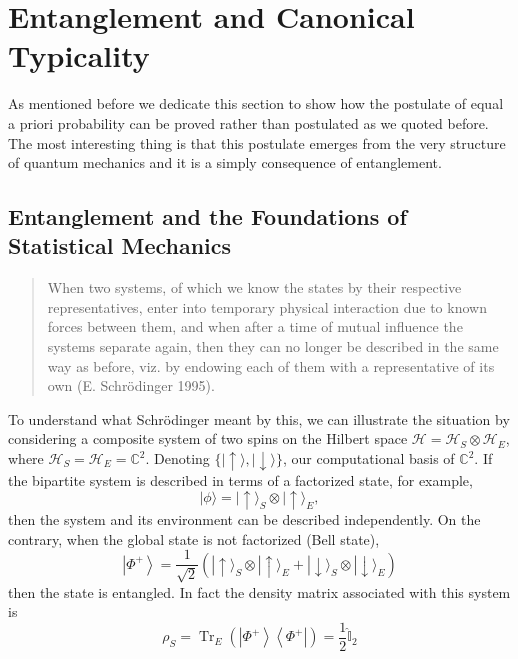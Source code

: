 \section{Entanglement and Canonical Typicality}

As mentioned before we dedicate this section to show how the postulate of equal a priori probability can be proved rather than postulated as we quoted before. The most interesting thing is that this postulate emerges from the very structure of quantum mechanics and it is a simply consequence of entanglement.
\subsection{Entanglement and the Foundations of Statistical Mechanics}
\begin{quote}
When two systems, of which we know the states by their respective representatives, enter into temporary physical interaction due to known forces between
them, and when after a time of mutual influence the systems separate again, then
they can no longer be described in the same way as before, viz. by endowing each
of them with a representative of its own (E. Schr\"odinger 1995\cite{schrodinger_discussion_1935}).
\end{quote}
To understand what Schr\"odinger meant by this, we can illustrate the situation by considering a composite system of two spins on the Hilbert space $\mathcal{H}=\mathcal{H}_S\otimes \mathcal{H}_{E}$, where $\mathcal{H}_{S}=\mathcal{H}_{E} = \mathbb{C}^{2}$. Denoting $\{|\uparrow\rangle,|\downarrow\rangle\}$, our computational basis of $\mathbb{C}^{2}$\cite{ekert_basic_2000, nielsen_quantum_2000, edwin_optimal_1979}.
If the bipartite system is described in terms of a factorized state, for example,
\begin{equation}
|\phi\rangle=|\uparrow\rangle_{S} \otimes|\uparrow\rangle_{E},
\label{CH1:Entanglement_example_1}
\end{equation}
then the system and its environment can be described independently. On the contrary, when the global state is not factorized (Bell state),
\begin{equation}
\left|\Phi^{+}\right\rangle=\frac{1}{\sqrt{2}}\left(|\uparrow\rangle_{S} \otimes|\uparrow\rangle_{E}+|\downarrow\rangle_{S} \otimes|\downarrow\rangle_{E}\right)
\label{CH1:Entanglement_example_2}
\end{equation}
then the state is entangled. In fact the density matrix associated with this system is
\begin{equation}
\rho_{S}=\operatorname{Tr}_{E}\left(\left|\Phi^{+}\right\rangle\left\langle\Phi^{+}\right|\right)=\frac{1}{2} \hat{\mathbb{I}}_{2}
\label{CH1:Entanglement_example_3}
\end{equation}

